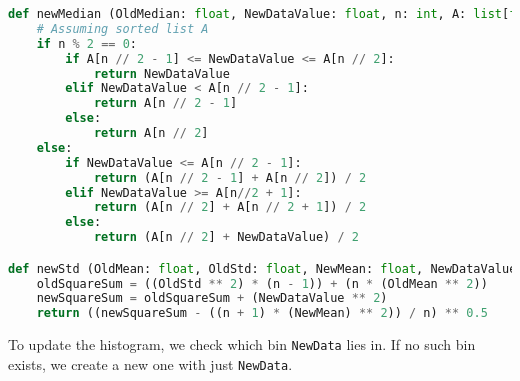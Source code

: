 \begin{itemize}
\begin{lstlisting}[language=Python, caption={Python code to calculate new Mean, Median and Standard deviation}]
def newMedian (OldMedian: float, NewDataValue: float, n: int, A: list[float]) -> float:
    # Assuming sorted list A
    if n % 2 == 0:
        if A[n // 2 - 1] <= NewDataValue <= A[n // 2]:
            return NewDataValue
        elif NewDataValue < A[n // 2 - 1]:
            return A[n // 2 - 1]
        else:
            return A[n // 2]
    else:
        if NewDataValue <= A[n // 2 - 1]:
            return (A[n // 2 - 1] + A[n // 2]) / 2
        elif NewDataValue >= A[n//2 + 1]:
            return (A[n // 2] + A[n // 2 + 1]) / 2
        else:
            return (A[n // 2] + NewDataValue) / 2

def newStd (OldMean: float, OldStd: float, NewMean: float, NewDataValue: float, n: int, A: list[float]) -> float:
    oldSquareSum = ((OldStd ** 2) * (n - 1)) + (n * (OldMean ** 2))
    newSquareSum = oldSquareSum + (NewDataValue ** 2)
    return ((newSquareSum - ((n + 1) * (NewMean) ** 2)) / n) ** 0.5
    \end{lstlisting}
	      To update the histogram, we check which bin \texttt{NewData} lies in. If no such bin exists, we create a new one with just \texttt{NewData}.
\end{itemize}
